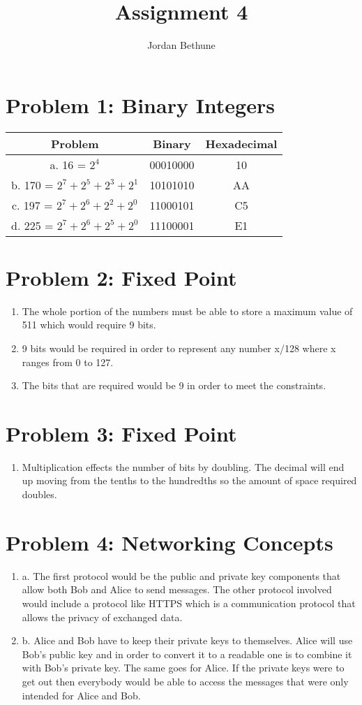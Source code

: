 \documentclass{article}
\title{Assignment 4}
\author{Jordan Bethune}
\begin{document}
\maketitle
\section{Problem 1: Binary Integers}
\begin{tabular}{|c|c|c|}
	\hline
	Problem & Binary & Hexadecimal\\
    \hline
    a. 16 = $2^4$ & 00010000 & 10\\
    \hline
    b. 170 = $2^7 + 2^5 + 2^3
	+ 2^1$ & 10101010 & AA\\ 
    \hline
    c. 197 = $2^7 + 2^6 + 2^2 + 2^0$ & 11000101 & C5\\
    \hline
    d. 225 = $2^7 + 2^6 + 2^5 + 2^0$ & 11100001 & E1\\
\end{tabular}
\section{Problem 2: Fixed Point}
\begin{enumerate}
\item The whole portion of the numbers must be able to store a maximum value of 511 which would require 9 bits. 
\item 9 bits would be required in order to represent any number x/128 where x ranges from 0 to 127. 
\item The bits that are required would be 9 in order to meet the constraints. 
\end{enumerate}
\section{Problem 3: Fixed Point}
\begin{enumerate}
\item Multiplication effects the number of bits by doubling. The decimal will end up moving from the tenths to the hundredths so the amount of space required doubles. 
\end{enumerate}
\section{Problem 4: Networking Concepts}
\begin{enumerate}
\item a. The first protocol would be the public and private key components that allow both Bob and Alice to send messages. The other protocol involved would include a protocol like HTTPS which is a communication protocol that allows the privacy of exchanged data. 
\item b. Alice and Bob have to keep their private keys to themselves. Alice will use Bob's public key and in order to convert it to a readable one is to combine it with Bob's private key. The same goes for Alice. If the private keys were to get out then everybody would be able to access the messages that were only intended for Alice and Bob. 
\end{enumerate}
\end{document}
